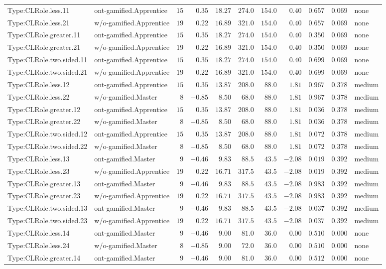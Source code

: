 \documentclass[6pt,a4paper]{article}
\begin{document}
{\begin{longtable}{llrrrrrrrrl}
Type:CLRole.less.11&ont-gamified.Apprentice&$15$&$ 0.35$&$18.27$&$274.0$&$154.0$&$ 0.40$&$0.657$&$0.069$&none\tabularnewline
Type:CLRole.less.21&w/o-gamified.Apprentice&$19$&$ 0.22$&$16.89$&$321.0$&$154.0$&$ 0.40$&$0.657$&$0.069$&none\tabularnewline
Type:CLRole.greater.11&ont-gamified.Apprentice&$15$&$ 0.35$&$18.27$&$274.0$&$154.0$&$ 0.40$&$0.350$&$0.069$&none\tabularnewline
Type:CLRole.greater.21&w/o-gamified.Apprentice&$19$&$ 0.22$&$16.89$&$321.0$&$154.0$&$ 0.40$&$0.350$&$0.069$&none\tabularnewline
Type:CLRole.two.sided.11&ont-gamified.Apprentice&$15$&$ 0.35$&$18.27$&$274.0$&$154.0$&$ 0.40$&$0.699$&$0.069$&none\tabularnewline
Type:CLRole.two.sided.21&w/o-gamified.Apprentice&$19$&$ 0.22$&$16.89$&$321.0$&$154.0$&$ 0.40$&$0.699$&$0.069$&none\tabularnewline
Type:CLRole.less.12&ont-gamified.Apprentice&$15$&$ 0.35$&$13.87$&$208.0$&$ 88.0$&$ 1.81$&$0.967$&$0.378$&medium\tabularnewline
Type:CLRole.less.22&w/o-gamified.Master&$ 8$&$-0.85$&$ 8.50$&$ 68.0$&$ 88.0$&$ 1.81$&$0.967$&$0.378$&medium\tabularnewline
Type:CLRole.greater.12&ont-gamified.Apprentice&$15$&$ 0.35$&$13.87$&$208.0$&$ 88.0$&$ 1.81$&$0.036$&$0.378$&medium\tabularnewline
Type:CLRole.greater.22&w/o-gamified.Master&$ 8$&$-0.85$&$ 8.50$&$ 68.0$&$ 88.0$&$ 1.81$&$0.036$&$0.378$&medium\tabularnewline
Type:CLRole.two.sided.12&ont-gamified.Apprentice&$15$&$ 0.35$&$13.87$&$208.0$&$ 88.0$&$ 1.81$&$0.072$&$0.378$&medium\tabularnewline
Type:CLRole.two.sided.22&w/o-gamified.Master&$ 8$&$-0.85$&$ 8.50$&$ 68.0$&$ 88.0$&$ 1.81$&$0.072$&$0.378$&medium\tabularnewline
Type:CLRole.less.13&ont-gamified.Master&$ 9$&$-0.46$&$ 9.83$&$ 88.5$&$ 43.5$&$-2.08$&$0.019$&$0.392$&medium\tabularnewline
Type:CLRole.less.23&w/o-gamified.Apprentice&$19$&$ 0.22$&$16.71$&$317.5$&$ 43.5$&$-2.08$&$0.019$&$0.392$&medium\tabularnewline
Type:CLRole.greater.13&ont-gamified.Master&$ 9$&$-0.46$&$ 9.83$&$ 88.5$&$ 43.5$&$-2.08$&$0.983$&$0.392$&medium\tabularnewline
Type:CLRole.greater.23&w/o-gamified.Apprentice&$19$&$ 0.22$&$16.71$&$317.5$&$ 43.5$&$-2.08$&$0.983$&$0.392$&medium\tabularnewline
Type:CLRole.two.sided.13&ont-gamified.Master&$ 9$&$-0.46$&$ 9.83$&$ 88.5$&$ 43.5$&$-2.08$&$0.037$&$0.392$&medium\tabularnewline
Type:CLRole.two.sided.23&w/o-gamified.Apprentice&$19$&$ 0.22$&$16.71$&$317.5$&$ 43.5$&$-2.08$&$0.037$&$0.392$&medium\tabularnewline
Type:CLRole.less.14&ont-gamified.Master&$ 9$&$-0.46$&$ 9.00$&$ 81.0$&$ 36.0$&$ 0.00$&$0.510$&$0.000$&none\tabularnewline
Type:CLRole.less.24&w/o-gamified.Master&$ 8$&$-0.85$&$ 9.00$&$ 72.0$&$ 36.0$&$ 0.00$&$0.510$&$0.000$&none\tabularnewline
Type:CLRole.greater.14&ont-gamified.Master&$ 9$&$-0.46$&$ 9.00$&$ 81.0$&$ 36.0$&$ 0.00$&$0.512$&$0.000$&none\tabularnewline

\end{longtable}}
\end{document}
